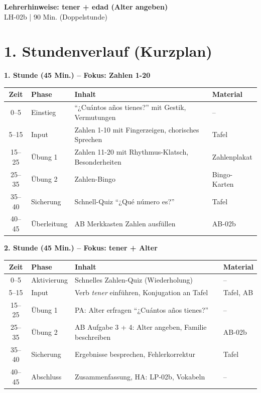 \documentclass[11pt, a4paper]{article}
\newcommand{\fachfarbe}{spanisch}
\newcommand{\thema}{tener + edad (Alter angeben)}
\newcommand{\sequenz}{02}
\newcommand{\block}{b}
\newcommand{\dauer}{90 Min. (Doppelstunde)}
\begin{document}
\begin{center}
    {\Large\bfseries\textcolor{\fachfarbe}{Lehrerhinweise: \thema}}\\[0.3em]
    {\normalsize LH-\sequenz\block{} | \dauer}
\end{center}

\vspace{10pt}


\section*{1. Stundenverlauf (Kurzplan)}

\textbf{1. Stunde (45 Min.) -- Fokus: Zahlen 1-20}

\begin{tabularx}{\textwidth}{|c|l|X|l|}
\hline
\textbf{Zeit} & \textbf{Phase} & \textbf{Inhalt} & \textbf{Material} \\
\hline
0--5 & Einstieg & ``¿Cuántos años tienes?'' mit Gestik, Vermutungen & -- \\
\hline
5--15 & Input & Zahlen 1-10 mit Fingerzeigen, chorisches Sprechen & Tafel \\
\hline
15--25 & Übung 1 & Zahlen 11-20 mit Rhythmus-Klatsch, Besonderheiten & Zahlenplakat \\
\hline
25--35 & Übung 2 & Zahlen-Bingo & Bingo-Karten \\
\hline
35--40 & Sicherung & Schnell-Quiz ``¿Qué número es?'' & Tafel \\
\hline
40--45 & Überleitung & AB Merkkasten Zahlen ausfüllen & AB-02b \\
\hline
\end{tabularx}

\vspace{1em}

\textbf{2. Stunde (45 Min.) -- Fokus: tener + Alter}

\begin{tabularx}{\textwidth}{|c|l|X|l|}
\hline
\textbf{Zeit} & \textbf{Phase} & \textbf{Inhalt} & \textbf{Material} \\
\hline
0--5 & Aktivierung & Schnelles Zahlen-Quiz (Wiederholung) & -- \\
\hline
5--15 & Input & Verb \textit{tener} einführen, Konjugation an Tafel & Tafel, AB \\
\hline
15--25 & Übung 1 & PA: Alter erfragen ``¿Cuántos años tienes?'' & -- \\
\hline
25--35 & Übung 2 & AB Aufgabe 3 + 4: Alter angeben, Familie beschreiben & AB-02b \\
\hline
35--40 & Sicherung & Ergebnisse besprechen, Fehlerkorrektur & Tafel \\
\hline
40--45 & Abschluss & Zusammenfassung, HA: LP-02b, Vokabeln & -- \\
\hline
\end{tabularx}
\end{document}

